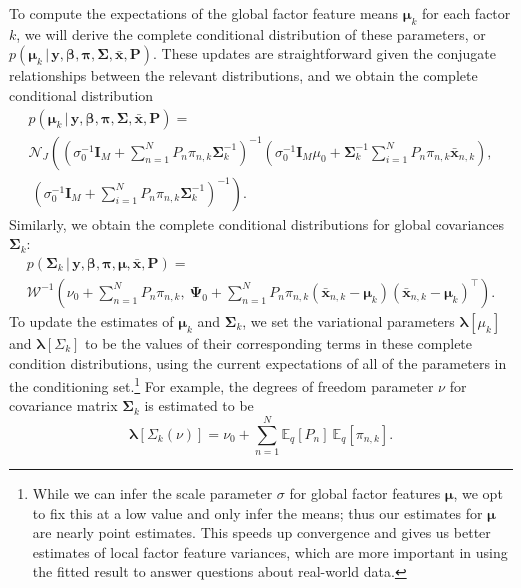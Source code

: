 \documentclass[twoside,11pt]{article}
\newcommand{\E}{\mathbb{E}}
\newcommand{\g}{\, | \,}
\begin{document}
To compute the expectations of the global factor feature means $\boldsymbol{\mu}_k$ for each factor $k$, we will derive the complete conditional distribution of these parameters, or $p(\boldsymbol{\mu}_k \g \boldsymbol{y}, \boldsymbol{\beta}, \boldsymbol{\pi}, \boldsymbol{\Sigma}, \boldsymbol{\bar{x}}, \boldsymbol{P})$.
These updates are straightforward given the conjugate relationships between the relevant distributions, and we obtain the complete conditional distribution
\begin{multline}
    p(\boldsymbol{\mu}_k \g \boldsymbol{y}, \boldsymbol{\beta}, \boldsymbol{\pi}, \boldsymbol{\Sigma}, \boldsymbol{\bar{x}}, \boldsymbol{P})
    = \\ \mathcal{N}_J\left( \left(\sigma_0^{-1} \mathbf{I}_M + \sum_{n=1}^N P_n \pi_{n,k} \boldsymbol{\Sigma}_k^{-1} \right)^{-1} \left(\sigma_0^{-1} \mathbf{I}_M \mu_0 + \boldsymbol{\Sigma}_k^{-1} \sum_{i=1}^N P_n \pi_{n,k} \boldsymbol{\bar{x}}_{n,k} \right), \right.\\
     \left. ~\left(\sigma_0^{-1} \mathbf{I}_M + \sum_{i=1}^N  P_n \pi_{n,k}\boldsymbol{\Sigma}_k^{-1} \right)^{-1}\right).
    \label{eq:complete_conditional_mu_assumption}
\end{multline}
Similarly, we obtain the complete conditional distributions for global covariances $\boldsymbol{\Sigma}_k$:
\begin{multline}
    p(\boldsymbol{\Sigma}_k \g \boldsymbol{y}, \boldsymbol{\beta}, \boldsymbol{\pi}, \boldsymbol{\mu}, \boldsymbol{\bar{x}}, \boldsymbol{P})
    = \\
    \mathcal{W}^{-1}\left(\nu_0 + \sum_{n=1}^N P_n \pi_{n,k}, 
    ~\boldsymbol{\Psi}_0 + \sum_{n=1}^N P_n \pi_{n,k} \left(\boldsymbol{\bar{x}}_{n,k}-\boldsymbol{\mu}_{k}\right)\left(\boldsymbol{\bar{x}}_{n,k}-\boldsymbol{\mu}_{k}\right)^\top\right).
    \label{eq:complete_conditional_Sigma_assumption}
\end{multline}
To update the estimates of $\boldsymbol{\mu}_k$ and $\boldsymbol{\Sigma}_k$, we set the variational parameters $\boldsymbol{\lambda}[\mu_k]$ and $\boldsymbol{\lambda}[\Sigma_k]$ to be the values of their corresponding terms in these complete condition distributions, using the current expectations of all of the parameters in the conditioning set.\footnote{While we can infer the scale parameter $\sigma$ for global factor features $\boldsymbol{\mu}$, we opt to fix this at a low value and only infer the means; thus our estimates for $\boldsymbol{\mu}$ are nearly point estimates.  This speeds up convergence and gives us better estimates of local factor feature variances, which are more important in using the fitted result to answer questions about real-world data.}   For example, the degrees of freedom parameter $\nu$ for covariance matrix $\boldsymbol{\Sigma}_k$ is estimated to be
\begin{equation}
    \boldsymbol{\lambda}[\Sigma_k(\nu)] =  \nu_0 + \sum_{n=1}^N \E_q[P_n]~ \E_q[\pi_{n,k}].
\end{equation}
\end{document}
